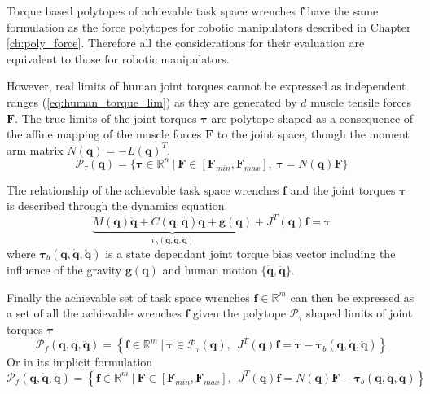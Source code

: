 Torque based polytopes \cite{rezzoug_application_2012,sasaki2011vertex} of achievable task space wrenches $\bm{f}$ have the same formulation as the force polytopes for robotic manipulators described in Chapter \ref{ch:poly_force}. Therefore all the considerations for their evaluation are equivalent to those for robotic manipulators.  

However, real limits of human joint torques cannot be expressed as independent ranges (\ref{eq:human_torque_lim}) as they are generated by $d$ muscle tensile forces $\bm{F}$. The true limits of the joint torques $\bm{\tau}$ are polytope shaped as a consequence of the affine mapping of the muscle forces $\bm{F}$ to the joint space, though the moment arm matrix $N(\bm{q})=-L(\bm{q})^T$.
\begin{equation}
\mathcal{P}_\tau(\bm{q}) = \{\bm{\tau} \in \mathbb{R}^n ~|~\bm{F}\in [\bm{F}_{min}, \bm{F}_{max}], ~\bm{\tau}=N(\bm{q})\bm{F}\}
\label{eq:poly_torque_human}
\end{equation}

The relationship of the achievable task space wrenches $\bm{f}$ and the joint torques $\bm{\tau}$ is described through the dynamics equation 
\begin{equation}
\underbrace{M(\bm{q})\ddot{\bm{q}} + C(\bm{q},\dot{\bm{q}})\dot{\bm{q}} + \bm{g}(\bm{q})}_{\bm{\tau}_b(\bm{q},\dot{\bm{q}},\ddot{\bm{q}})} + J^T(\bm{q})\bm{f} = \bm{\tau} 
\end{equation}
where $\bm{\tau}_b(\bm{q},\dot{\bm{q}},\ddot{\bm{q}})$ is a state dependant joint torque bias vector including the influence of the gravity $\bm{g}(\bm{q})$ and human motion $\{\dot{\bm{q}},\ddot{\bm{q}}\}$. 

Finally the achievable set of task space wrenches $\bm{f}\in\mathbb{R}^m$ can then be expressed as a set of all the achievable wrenches $\bm{f}$ given the polytope $\mathcal{P}_\tau$ shaped limits of joint torques $\bm{\tau}$
\begin{equation}
    \mathcal{P}_f(\bm{q},\dot{\bm{q}},\ddot{\bm{q}}) = \left\{ \bm{f} \in \mathbb{R}^m ~|~ \bm{\tau}\in \mathcal{P}_\tau(\bm{q}), ~~ J^T(\bm{q})\bm{f} = \bm{\tau} -\bm{\tau}_b(\bm{q},\dot{\bm{q}},\ddot{\bm{q}}) \right\}
\end{equation}
Or in its implicit formulation
\begin{equation}
    \mathcal{P}_f(\bm{q},\dot{\bm{q}},\ddot{\bm{q}}) = \left\{ \bm{f} \in \mathbb{R}^m ~|~ \bm{F}\in\left[\bm{F}_{min}, \bm{F}_{max} \right], ~~ \!J^T(\bm{q})\bm{f} =\! N(\bm{q})\bm{F} -\bm{\tau}_b(\bm{q},\dot{\bm{q}},\ddot{\bm{q}}) \right\}
    \label{eq:human_force_poly}
\end{equation}

